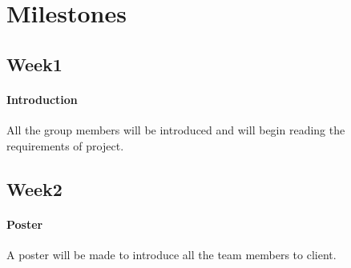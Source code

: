 \documentclass[11pt, a4paper]{report}
\begin{document}








\section{Milestones}
\subsection{Week1}
\paragraph{Introduction}
All the group members will be introduced and will begin reading the requirements of project.


\subsection{Week2}
\paragraph{Poster}
A poster will be made to introduce all the team members to client.
\end{document}
